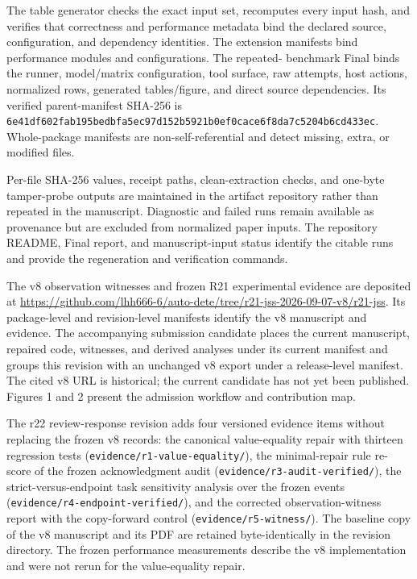\documentclass[preprint,12pt,authoryear]{elsarticle}
\newcommand{\code}[1]{\nolinkurl{#1}}
\begin{document}
The table generator checks the exact input set, recomputes every input hash, and verifies that
correctness and performance metadata bind the declared source, configuration, and dependency
identities. The extension manifests bind performance modules and configurations. The repeated-
benchmark Final binds the runner, model/matrix configuration, tool surface, raw attempts, host
actions, normalized rows, generated tables/figure, and direct source dependencies. Its verified
parent-manifest SHA-256 is
\code{6e41df602fab195bedbfa5ec97d152b5921b0ef0cace6f8da7c5204b6cd433ec}.
Whole-package manifests are non-self-referential and detect missing, extra, or modified files.

Per-file SHA-256 values, receipt paths, clean-extraction checks, and one-byte tamper-probe outputs
are maintained in the artifact repository rather than repeated in the manuscript. Diagnostic and
failed runs remain available as provenance but are excluded from normalized paper inputs. The
repository README, Final report, and manuscript-input status identify the citable runs and provide
the regeneration and verification commands.

The v8 observation witnesses and frozen R21 experimental evidence are deposited at \url{https://github.com/lhh666-6/auto-dete/tree/r21-jss-2026-09-07-v8/r21-jss}. Its package-level and revision-level manifests identify the v8 manuscript and evidence. The accompanying submission candidate places the current manuscript, repaired code, witnesses, and derived analyses under its current manifest and groups this revision with an unchanged v8 export under a release-level manifest. The cited v8 URL is historical; the current candidate has not yet been published. Figures 1 and 2 present the admission workflow and contribution map.

The r22 review-response revision adds four versioned evidence items without replacing the frozen v8 records: the canonical value-equality repair with thirteen regression tests (\code{evidence/r1-value-equality/}), the minimal-repair rule re-score of the frozen acknowledgment audit (\code{evidence/r3-audit-verified/}), the strict-versus-endpoint task sensitivity analysis over the frozen events (\code{evidence/r4-endpoint-verified/}), and the corrected observation-witness report with the copy-forward control (\code{evidence/r5-witness/}). The baseline copy of the v8 manuscript and its PDF are retained byte-identically in the revision directory. The frozen performance measurements describe the v8 implementation and were not rerun for the value-equality repair.
\end{document}

